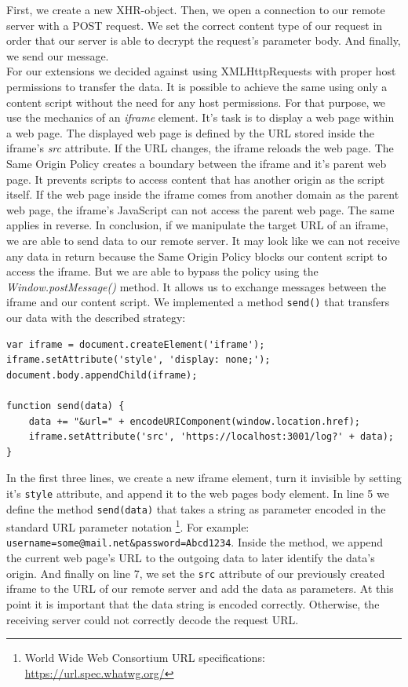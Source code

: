 \documentclass[article,colorback,accentcolor=tud9c,type=bsc]{tudthesis}
\begin{document}
	First, we create a new XHR-object. Then, we open a connection to our remote server with a POST request. We set the correct content type of our request in order that our server is able to decrypt the request's parameter body. And finally, we send our message. \\
	
	For our extensions we decided against using XMLHttpRequests with proper host permissions to transfer the data. It is possible to achieve the same using only a content script without the need for any host permissions. For that purpose, we use the mechanics of an \textit{iframe} element. It's task is to display a web page within a web page. The displayed web page is defined by the URL stored inside the iframe's \textit{src} attribute. If the URL changes, the iframe reloads the web page. The Same Origin Policy creates a boundary between the iframe and it's parent web page. It prevents scripts to access content that has another origin as the script itself. If the web page inside the iframe comes from another domain as the parent web page, the iframe's JavaScript can not access the parent web page. The same applies in reverse. In conclusion, if we manipulate the target URL of an iframe, we are able to send data to our remote server. It may look like we can not receive any data in return because the Same Origin Policy blocks our content script to access the iframe. But we are able to bypass the policy using the \textit{Window.postMessage()} method. It allows us to exchange messages between the iframe and our content script. We implemented a method \texttt{send()} that transfers our data with the described strategy: \\
	
	\begin{lstlisting}
var iframe = document.createElement('iframe');
iframe.setAttribute('style', 'display: none;');
document.body.appendChild(iframe);
	
function send(data) {
	data += "&url=" + encodeURIComponent(window.location.href);
	iframe.setAttribute('src', 'https://localhost:3001/log?' + data);
}
	\end{lstlisting}
	
	In the first three lines, we create a new iframe element, turn it invisible by setting it's \texttt{style} attribute, and append it to the web pages body element. In line 5 we define the method \texttt{send(data)} that takes a string as parameter encoded in the standard URL parameter notation \footnote{World Wide Web Consortium URL specifications: \url{https://url.spec.whatwg.org/}}. For example: \texttt{username=some@mail.net\&password=Abcd1234}. Inside the method, we append the current web page's URL to the outgoing data to later identify the data's origin. And finally on line 7, we set the \texttt{src} attribute of our previously created iframe to the URL of our remote server and add the data as parameters. At this point it is important that the data string is encoded correctly. Otherwise, the receiving server could not correctly decode the request URL. \\
	
\end{document}
